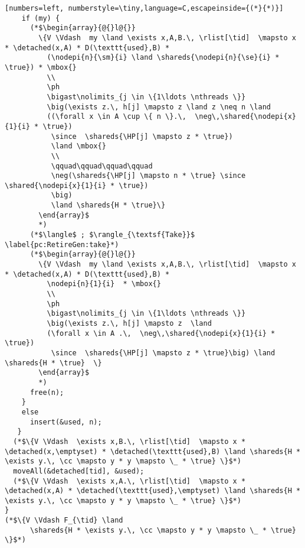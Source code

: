 \begin{figure*}
{\begin{lstlisting}[numbers=left, numberstyle=\tiny,language=C,escapeinside={(*}{*)}]
    if (my) {
      (*$\begin{array}{@{}l@{}} 
        \{V \Vdash  my \land \exists x,A,B.\, \rlist[\tid]  \mapsto x * \detached(x,A) * D(\texttt{used},B) * 
          (\nodepi{n}{\sm}{i} \land \shareds{\nodepi{n}{\se}{i} * \true}) * \mbox{}
          \\
          \ph 
          \bigast\nolimits_{j \in \{1\ldots \nthreads \}}
          \big(\exists z.\, h[j] \mapsto z \land z \neq n \land 
          ((\forall x \in A \cup \{ n \}.\,  \neg\,\shared{\nodepi{x}{1}{i} * \true}) 
           \since  \shareds{\HP[j] \mapsto z * \true})
           \land \mbox{}
           \\
           \qquad\qquad\qquad\qquad           
           \neg(\shareds{\HP[j] \mapsto n * \true} \since \shared{\nodepi{x}{1}{i} * \true})
           \big) 
           \land \shareds{H * \true}\}
        \end{array}$
        *)  
      (*$\langle$ ; $\rangle_{\textsf{Take}}$ \label{pc:RetireGen:take}*)
      (*$\begin{array}{@{}l@{}} 
        \{V \Vdash  my \land \exists x,A,B.\, \rlist[\tid]  \mapsto x * \detached(x,A) * D(\texttt{used},B) * 
          \nodepi{n}{1}{i}  * \mbox{}
          \\
          \ph 
          \bigast\nolimits_{j \in \{1\ldots \nthreads \}}
          \big(\exists z.\, h[j] \mapsto z  \land 
          (\forall x \in A .\,  \neg\,\shared{\nodepi{x}{1}{i} * \true}) 
           \since  \shareds{\HP[j] \mapsto z * \true}\big) \land \shareds{H * \true}  \}
        \end{array}$
        *)  
      free(n);
    } 
    else 
      insert(&used, n);
   }  
  (*$\{V \Vdash  \exists x,B.\, \rlist[\tid]  \mapsto x * \detached(x,\emptyset) * \detached(\texttt{used},B) \land \shareds{H * \exists y.\, \cc \mapsto y * y \mapsto \_ * \true} \}$*)   
  moveAll(&detached[tid], &used);   
  (*$\{V \Vdash  \exists x,A.\, \rlist[\tid]  \mapsto x * \detached(x,A) * \detached(\texttt{used},\emptyset) \land \shareds{H * \exists y.\, \cc \mapsto y * y \mapsto \_ * \true} \}$*)   
}
(*$\{V \Vdash F_{\tid} \land 
      \shareds{H * \exists y.\, \cc \mapsto y * y \mapsto \_ * \true} \}$*)
 \end{lstlisting}
}
\caption{\label{fig:RetireList}Proof outline for \texttt{retire}  
which uses a local copy of the hazard array.
The proof is for arbitrary algorithms where the notion of 
a cell being ``in the data structure'' is encoded by having the full permission for
the cell in the shared state.
$V=\{\texttt{used},\texttt{my},\texttt{n},\texttt{p},\texttt{n},\texttt{h}\}$.
The only actions \texttt{retire()} is allowed to execute are $\textsf{Id}$, $\textsf{Write}$ and $\textsf{Take}$.
The detached set is implemented using a linked list, where the links are stored in the first cell of a detached node).
We use $\nodepi{x}{p}{i} = x \mapsto_p \_ * \ldots * x + i-1 \mapsto_p \_ $ as a shorthand for an assertion denoting 
having  permission $p$ for $i$ consecutive cells starting at address $p$.}
\end{figure*}



